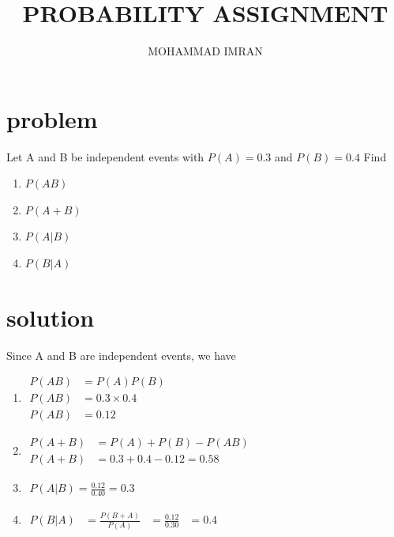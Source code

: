 \documentclass[journal,12pt,twocolumn]{article}
\title{PROBABILITY ASSIGNMENT}
\author{MOHAMMAD IMRAN}
\begin{document}
\maketitle
\bigskip

\section{problem }

Let A and B be independent events with $P(A)=0.3$ and $P(B)=0.4$ Find 
\begin{enumerate}

\item$P(AB)$
\item$P(A+B)$ 
\item$P(A | B)$   
\item$P(B | A)$
       \end{enumerate}
\section{solution }  


Since A and B are independent events, we have 

\begin{enumerate}

\item $\begin{aligned}
 P(AB)&=P(A) P(B)&\\
P(AB)&=0.3 \times 0.4&\\
P(AB)&=0.12&
\end{aligned}$


\item $\begin{aligned}
P(A+B)&=P(A)+P(B)-P(AB)&\\
P(A+B)&=0.3+0.4-0.12=0.58&
\end{aligned}$


\item $\begin{aligned}
P(A | B)=\frac{0.12}{0.40}=0.3
\end{aligned}$
\item $\begin{aligned}
P(B | A)&=\frac{P(B+A)}{P(A)}&=\frac{0.12}{0.30}&=0.4&
\end{aligned}$
\end{enumerate}
\end{document}
